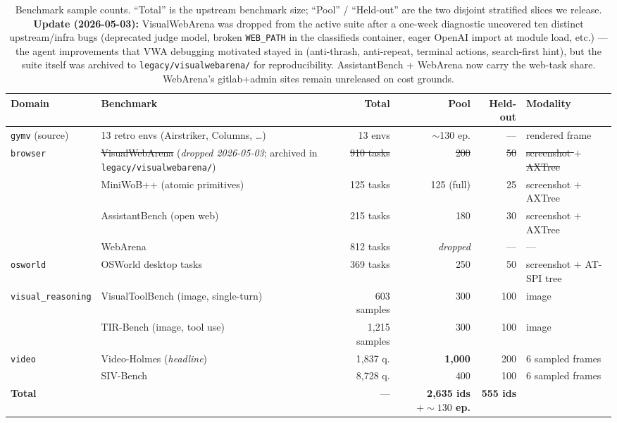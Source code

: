 \begin{table}[t]
\centering
\small
\caption{Benchmark sample counts. ``Total'' is the upstream benchmark
size; ``Pool'' / ``Held-out'' are the two disjoint stratified slices we
release. \textbf{Update (2026-05-03):} VisualWebArena was dropped
from the active suite after a one-week diagnostic uncovered ten
distinct upstream/infra bugs (deprecated judge model, broken
\texttt{WEB\_PATH} in the classifieds container, eager OpenAI
import at module load, etc.) — the agent improvements that VWA
debugging motivated stayed in (anti-thrash, anti-repeat, terminal
actions, search-first hint), but the suite itself was archived to
\texttt{legacy/visualwebarena/} for reproducibility. AssistantBench
+ WebArena now carry the web-task share. WebArena's gitlab+admin
sites remain unreleased on cost grounds.}
\label{tab:bench-sizes}
\renewcommand{\arraystretch}{1.10}
\begin{tabular}{@{}llrrrl@{}}
\toprule
\textbf{Domain} & \textbf{Benchmark} & \textbf{Total} & \textbf{Pool} & \textbf{Held-out} & \textbf{Modality} \\
\midrule
\multirow{1}{*}{\texttt{gymv} (source)}
  & 13 retro envs (Airstriker, Columns, \ldots) & 13 envs        & $\sim$130 ep.        & ---  & rendered frame \\
\midrule
\multirow{4}{*}{\texttt{browser}}
  & \st{VisualWebArena} (\emph{dropped 2026-05-03}; archived in \texttt{legacy/visualwebarena/}) & \st{910 tasks} & \st{200} & \st{50} & \st{screenshot $+$ AXTree} \\
  & MiniWoB++ (atomic primitives)               & 125 tasks      & 125 (full)           & 25   & screenshot $+$ AXTree \\
  & AssistantBench (open web)                   & 215 tasks      & 180                  & 30   & screenshot $+$ AXTree \\
  & WebArena                                    & 812 tasks      & \emph{dropped}       & ---  & --- \\
\midrule
\texttt{osworld}
  & OSWorld desktop tasks                       & 369 tasks      & 250                  & 50   & screenshot $+$ AT-SPI tree \\
\midrule
\multirow{2}{*}{\texttt{visual\_reasoning}}
  & VisualToolBench (image, single-turn)        & 603 samples    & 300                  & 100  & image \\
  & TIR-Bench (image, tool use)                 & 1{,}215 samples& 300                  & 100  & image \\
\midrule
\multirow{2}{*}{\texttt{video}}
  & Video-Holmes (\emph{headline})              & 1{,}837 q.     & \textbf{1{,}000}     & 200  & 6 sampled frames \\
  & SIV-Bench                                   & 8{,}728 q.     & 400                  & 100  & 6 sampled frames \\
\midrule
\textbf{Total}    &                              & ---            & \textbf{2{,}635 ids $+\sim\!130$ ep.} & \textbf{555 ids} & \\
\bottomrule
\end{tabular}
\end{table}

